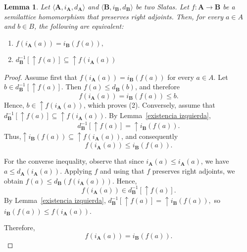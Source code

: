 \documentclass[10pt,a4paper]{amsart}
\newtheorem{lemma}{Lemma}
\begin{document}
\begin{lemma}\label{homo slata}
    Let $\langle \mathbf{A}, i_{\mathbf{A}}, d_{\mathbf{A}}\rangle$ and  $\langle \mathbf{B}, i_{\mathbf{B}}, d_{\mathbf{B}}\rangle$ be two Slatas. Let $f:\mathbf{A}\to \mathbf{B}$ be a semilattice homomorphism that preserves right adjoints. Then, for every $a\in A$ and $b\in B$, the following are equivalent: 
    \begin{enumerate}
        \item $f(i_\mathbf{A}(a))=i_{\mathbf{B}}(f(a)),$
        \item $d_\mathbf{B}^{-1}[\uparrow f(a)]\subseteq\uparrow f(i_\mathbf{A}(a))$
    \end{enumerate}
\end{lemma}

\begin{proof}
Assume first that
$f(i_\mathbf{A}(a))=i_\mathbf{B}(f(a))$
for every $a\in A$. Let
$b\in d_\mathbf{B}^{-1}[\uparrow f(a)]$.
Then
$f(a)\leq d_\mathbf{B}(b)$,
and therefore
$$
f(i_\mathbf{A}(a))
=
i_\mathbf{B}(f(a))
\leq b.
$$
Hence,
$b\in \uparrow f(i_\mathbf{A}(a))$,
which proves (2). Conversely, assume that
$d_\mathbf{B}^{-1}[\uparrow f(a)]
\subseteq
\uparrow f(i_\mathbf{A}(a))$.
By Lemma~\ref{existencia izquierda},
$$
d_\mathbf{B}^{-1}[\uparrow f(a)]
=
\uparrow i_\mathbf{B}(f(a)).
$$
Thus,$\uparrow i_\mathbf{B}(f(a))
\subseteq
\uparrow f(i_\mathbf{A}(a))$,
and consequently
$$
f(i_\mathbf{A}(a))
\leq
i_\mathbf{B}(f(a)).
$$

For the converse inequality, observe that since
$i_\mathbf{A}(a)\leq i_\mathbf{A}(a)$,
we have $a\leq d_\mathbf{A}(i_\mathbf{A}(a))$. Applying $f$ and using that $f$ preserves right adjoints, we obtain
$f(a)\leq d_\mathbf{B}(f(i_\mathbf{A}(a)))$.
Hence,
$$
f(i_\mathbf{A}(a))
\in
d_\mathbf{B}^{-1}[\uparrow f(a)].
$$
By Lemma~\ref{existencia izquierda}, $d_\mathbf{B}^{-1}[\uparrow f(a)]=\uparrow i_\mathbf{B}(f(a)),$
so $i_\mathbf{B}(f(a))\leq f(i_\mathbf{A}(a)).$

Therefore,
$$
f(i_\mathbf{A}(a))
=
i_\mathbf{B}(f(a)).
$$
\end{proof}
\end{document}
